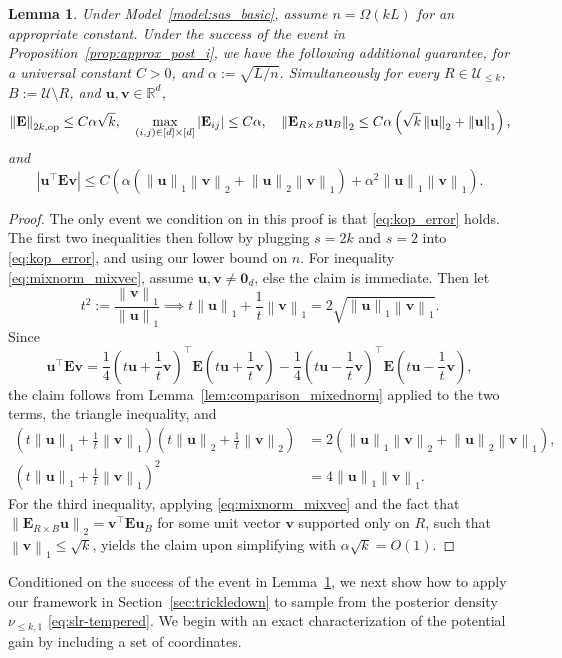\documentclass[11pt]{article}
\newtheorem{lemma}{Lemma}
\newcommand{\defeq}{:=}
\newcommand{\norm}[1]{\left\lVert#1\right\rVert}
\newcommand{\R}{\mathbb{R}}
\newcommand{\1}{\mathbf{1}}
\newcommand{\0}{\mathbf{0}}
\newcommand{\Par}[1]{\left(#1\right)}
\newcommand{\Abs}[1]{\left|#1\right|}
\newcommand{\twonorm}[1]{\norm{#1}_2}
\newcommand{\onenorm}[1]{\norm{#1}_1}
\newcommand{\me}{{\mathbf{E}}}
\newcommand{\normkop}[2]{{\left\lVert#1\right\rVert_{#2, \textup{op}}}}
\newcommand{\vu}{{\mathbf{u}}}
\newcommand{\vv}{{\mathbf{v}}}
\newcommand{\calU}{{\mathcal{U}}}
\begin{document}
\begin{lemma}
\label{lem:slr-gaussian-profile}
Under Model~\ref{model:sas_basic}, assume $n = \Omega(kL)$ for an appropriate constant. Under the success of the event in Proposition~\ref{prop:approx_post_i}, we have the following additional guarantee, for a universal constant $C > 0$, and $\alpha \defeq \sqrt{L/n}$. Simultaneously for every
$R\in \calU_{\le k}$, $B \defeq \calU\setminus R$, and 
$\vu,\vv \in \R^d$,
\[
    \normkop{\me}{2k}\le C\alpha\sqrt{k},
    \quad
    \max_{(i,j)\in[d]\times[d]} \Abs{\me_{ij}} \le C\alpha,
    \quad
    \norm{\me_{R\times B}\vu_B}_2
    \le
    C\alpha\left(
        \sqrt{k}\twonorm{\vu}+\onenorm{\vu}
    \right),
\]
and
\begin{equation}\label{eq:mixnorm_mixvec}
    \Abs{\vu^\top\me\vv}
    \le
    C\Par{
        \alpha\left(
            \onenorm{\vu}\twonorm{\vv}
            +
            \twonorm{\vu}\onenorm{\vv}
        \right)
        +
        \alpha^2\onenorm{\vu}\onenorm{\vv}
    }.
\end{equation}
\end{lemma}
\begin{proof}
The only event we condition on in this proof is that \eqref{eq:kop_error} holds.
The first two inequalities then follow by plugging $s = 2k$ and $s = 2$ into \eqref{eq:kop_error}, and using our lower bound on $n$. 
For inequality \eqref{eq:mixnorm_mixvec}, assume $\vu, \vv \neq \0_d$, else the claim is immediate. Then let 
\[t^2 \defeq \frac{\norm{\vv}_1}{\norm{\vu}_1} \implies t\norm{\vu}_1 + \frac 1 t \norm{\vv}_1 = 2\sqrt{\norm{\vu}_1\norm{\vv}_1}.\]
Since
\[\vu^\top \me \vv = \frac 1 4\Par{t\vu + \frac 1 t \vv}^\top \me\Par{t\vu + \frac 1 t \vv} - \frac 1 4\Par{t\vu - \frac 1 t \vv}^\top \me \Par{t\vu - \frac 1 t \vv},\]
the claim follows from Lemma~\ref{lem:comparison_mixednorm} applied to the two terms, the triangle inequality, and
\begin{align*}
\Par{t\norm{\vu}_1 + \frac 1 t \norm{\vv}_1}\Par{t\norm{\vu}_2 + \frac 1 t \norm{\vv}_2} &= 2\Par{\norm{\vu}_1\norm{\vv}_2 + \norm{\vu}_2\norm{\vv}_1}, \\
\Par{t\norm{\vu}_1 + \frac 1 t \norm{\vv}_1}^2 &= 4\norm{\vu}_1\norm{\vv}_1.
\end{align*}
For the third inequality, applying \eqref{eq:mixnorm_mixvec} and the fact that $\norm{\me_{R \times B}\vu}_2 = \vv^\top \me \vu_B$ for some unit vector $\vv$ supported only on $R$, such that $\norm{\vv}_1 \le \sqrt{k}$, yields the claim upon simplifying with $\alpha\sqrt{k} = O(1)$.
\end{proof}
Conditioned on the success of the event in Lemma~\ref{lem:slr-gaussian-profile}, we next show how to apply our framework in Section~\ref{sec:trickledown} to sample from the posterior density $\nu_{\le k , 1}$ \eqref{eq:slr-tempered}. We begin with an exact characterization of the potential gain by including a set of coordinates.
\end{document}
